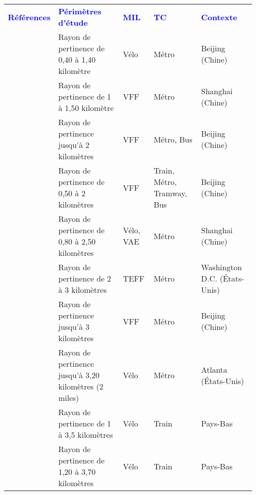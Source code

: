         \begin{longtable}{p{3cm}p{4cm}p{1.5cm}p{1.8cm}p{2.3cm}}
        \hline
        \textcolor{blue}{\textbf{Références}} & \textcolor{blue}{\textbf{Périmètres d'étude}} & \textcolor{blue}{\textbf{MIL}} & \textcolor{blue}{\textbf{TC}} & \textcolor{blue}{\textbf{Contexte}}
        \hline
        \endhead
\multicolumn{5}{l}{\textbf{Distances spatiales}}\\
    \small{\textcite{wang_interchange_2016}}\index{Wang, Zi-jia|pagebf} & \small{Rayon de pertinence de 0,40 à 1,40 kilomètre} & \small{Vélo} & \small{Métro} & \small{Beijing (Chine)}\\
    \small{\textcite{hu_examining_2022}}\index{Hu, Songhua|pagebf} & \small{Rayon de pertinence de 1 à 1,50 kilomètre} & \small{VFF} & \small{Métro} & \small{Shanghai (Chine)}\\
    \small{\textcite{jin_competition_2019}}\index{Jin, Haitao|pagebf} & \small{Rayon de pertinence jusqu'à 2 kilomètres} & \small{VFF} & \small{Métro, Bus} & \small{Beijing (Chine)}\\
    \small{\textcite{fan_how_2019}}\index{Fan, Aihua|pagebf} & \small{Rayon de pertinence de 0,50 à 2 kilomètres} & \small{VFF} & \small{Train, Métro, Tramway, Bus} & \small{Beijing (Chine)}\\
    \small{\textcite{pan_intermodal_2010}}\index{Pan, Haixiao|pagebf} & \small{Rayon de pertinence de 0,80 à 2,50 kilomètres} & \small{Vélo, VAE} & \small{Métro} & \small{Shanghai (Chine)}\\
    \small{\textcite{ma_connecting_2022}}\index{Ma, Qingyu|pagebf} & \small{Rayon de pertinence de 2 à 3 kilomètres} & \small{TEFF} & \small{Métro} & \small{Washington D.C. (États-Unis)}\\
    \small{\textcite{li_unbalanced_2022}}\index{Li, Lili|pagebf} & \small{Rayon de pertinence jusqu'à 3 kilomètres} & \small{VFF} & \small{Métro} & \small{Beijing (Chine)}\\
    \small{\textcite{bearn_adaption_2018}}\index{Bearn, Cary|pagebf} & \small{Rayon de pertinence jusqu'à 3,20 kilomètres (2 miles)} & \small{Vélo} & \small{Métro} & \small{Atlanta (États-Unis)}\\
    \small{\textcite{keijer_how_2000}}\index{Keijer, Majanka|pagebf} & \small{Rayon de pertinence de 1 à 3,5 kilomètres} & \small{Vélo} & \small{Train} & \small{Pays-Bas}\\
    \small{\textcite{rietveld_accessibility_2000}}\index{Rietveld, Piet|pagebf} & \small{Rayon de pertinence de 1,20 à 3,70 kilomètres} & \small{Vélo} & \small{Train} & \small{Pays-Bas}\\

\end{longtable}
